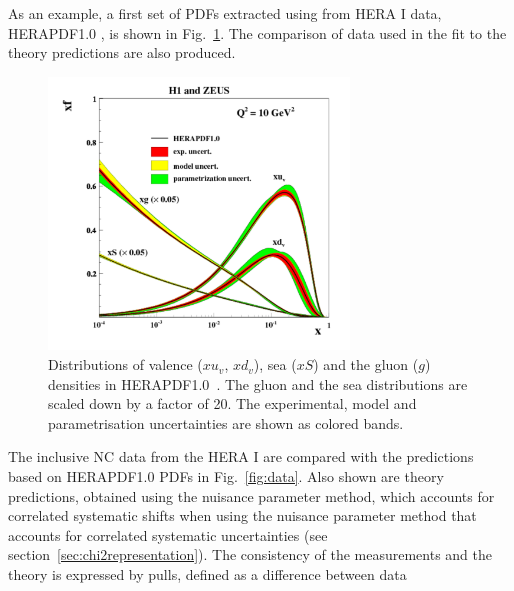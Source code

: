 \begin{description}
As an example, a first set of PDFs extracted using \fitter from HERA I data, HERAPDF1.0 \cite{h1zeus:2009wt}, 
is shown in Fig.~\ref{fig:hera1}.
The comparison of data used in the fit to the theory predictions are also produced. 
\begin{figure}[!ht]
   \centering
   \includegraphics[width=8cm]{hera1.pdf}
   \caption{Distributions of valence ($xu_v$, $xd_v$), sea ($xS$) and the gluon ($g$) densities in HERAPDF1.0~\cite{h1zeus:2009wt}. 
       The gluon and the sea distributions are scaled down by a factor of 20.
       The experimental, model and parametrisation uncertainties are shown as colored bands.}
 \label{fig:hera1}
\end{figure}
The inclusive NC data from the HERA I are compared with the predictions based on 
HERAPDF1.0 PDFs in Fig.~\ref{fig:data}.
Also shown are theory predictions, obtained using the nuisance parameter method, 
which accounts for correlated systematic
shifts when using the nuisance parameter method that accounts for 
correlated systematic uncertainties (see section~\ref{sec:chi2representation}). 
The consistency of the measurements and the theory is expressed by pulls, defined as a difference between data 

\end{description}
